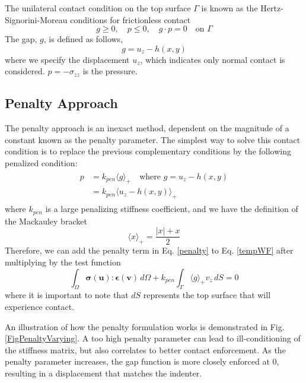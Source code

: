 \documentclass[12pt,3p]{article}
\begin{document}
 The unilateral contact condition on the top surface $\Gamma$ is known as the Hertz-Signorini-Moreau conditions for frictionless contact 
\begin{equation}
g \geq 0, \quad p \leq 0, \quad g \cdot p = 0 \quad \text{on } \Gamma
\end{equation}
The gap, $g$, is defined as follows,
\begin{equation*}
g = u_z - h(x,y)
\end{equation*}
where we specify the displacement $u_z$, which indicates only normal contact is considered. $p = - \sigma_{zz}$ is the pressure. 

\subsection{Penalty Approach}
The penalty approach is an inexact method, dependent on the magnitude of a constant known as the penalty parameter. The simplest way to solve this contact condition is to replace the previous complementary conditions by the following penalized condition:
\begin{align}\label{penalty}
\begin{split}
p &= k_{pen} \langle g \rangle_{+} \quad \text{where } g = u_z - h(x,y)  \\
	&= k_{pen} \langle u_z - h(x,y) \rangle_{+}
\end{split}
\end{align}
where $k_{pen}$ is a large penalizing stiffness coefficient, and we have the definition of the Mackauley bracket
\begin{equation}\label{ppos}
\langle x \rangle_{+} = \frac{|x| + x}{2} 
\end{equation}
Therefore, we can add the penalty term in Eq. \ref{penalty} to Eq. \ref{tempWF} after multiplying by the test function 
\begin{equation*}
\int_{\Omega} \bm{ \sigma(u) : \bm{\epsilon(v) }} \, d \Omega + k_{pen} \int_{\Gamma} \langle g \rangle_{+} v_z \, dS  = 0 
\end{equation*}
where it is important to note that $dS$ represents the top surface that will experience contact. 

An illustration of how the penalty formulation works is demonstrated in Fig. \ref{FigPenaltyVarying}. A too high penalty parameter can lead to ill-conditioning of the stiffness matrix, but also correlates to better contact enforcement. As the penalty parameter increases, the gap function is more closely enforced at 0, resulting in a displacement that matches the indenter.
\end{document}
